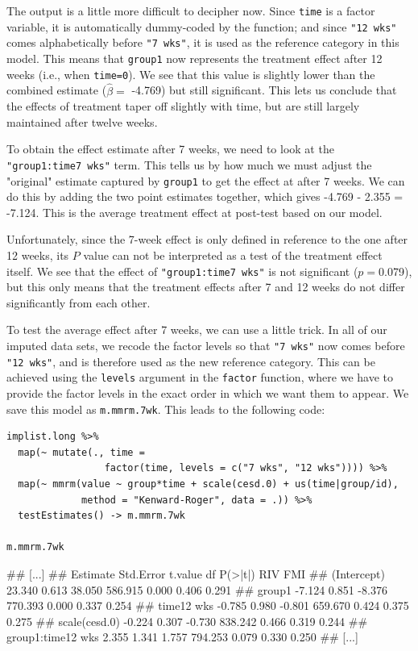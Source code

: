 The output is a little more difficult to decipher now. Since \texttt{time} is a factor variable, it is automatically dummy-coded by the function; and since \texttt{"12 wks"} comes alphabetically before \texttt{"7 wks"}, it is used as the reference category in this model. This means that \texttt{group1} now represents the treatment effect after 12 weeks (i.e., when \texttt{time=0}). We see that this value is slightly lower than the combined estimate ($\hat\beta=$ -4.769) but still significant. This lets us conclude that the effects of treatment taper off slightly with time, but are still largely maintained after twelve weeks. 

To obtain the effect estimate after 7 weeks, we need to look at the \texttt{"group1:time7 wks"} term. This tells us by how much we must adjust the "original" estimate captured by \texttt{group1} to get the effect at after 7 weeks. We can do this by adding the two point estimates together, which gives -4.769 - 2.355 = -7.124. This is the average treatment effect at post-test based on our model. 

Unfortunately, since the 7-week effect is only defined in reference to the one after 12 weeks, its $P$ value can not be interpreted as a test of the treatment effect itself. We see that the effect of \texttt{"group1:time7 wks"} is not significant ($p=$0.079), but this only means that the treatment effects after 7 and 12 weeks do not differ significantly from each other. 

To test the average effect after 7 weeks, we can use a little trick. In all of our imputed data sets, we recode the factor levels so that \texttt{"7 wks"} now comes before \texttt{"12 wks"}, and is therefore used as the new reference category. This can be achieved using the \texttt{levels} argument in the \texttt{factor} function, where we have to provide the factor levels in the exact order in which we want them to appear. We save this model as \texttt{m.mmrm.7wk}. This leads to the following code:

\begin{lstlisting}
implist.long %>% 
  map(~ mutate(., time = 
                 factor(time, levels = c("7 wks", "12 wks")))) %>% 
  map(~ mmrm(value ~ group*time + scale(cesd.0) + us(time|group/id), 
             method = "Kenward-Roger", data = .)) %>% 
  testEstimates() -> m.mmrm.7wk

m.mmrm.7wk
\end{lstlisting}

\begin{example}
## [...]
##                   Estimate Std.Error t.value      df P(>|t|)   RIV   FMI 
## (Intercept)         23.340     0.613  38.050 586.915   0.000 0.406 0.291 
## group1              -7.124     0.851  -8.376 770.393   0.000 0.337 0.254 
## time12 wks          -0.785     0.980  -0.801 659.670   0.424 0.375 0.275 
## scale(cesd.0)       -0.224     0.307  -0.730 838.242   0.466 0.319 0.244 
## group1:time12 wks    2.355     1.341   1.757 794.253   0.079 0.330 0.250 
## [...]
\end{example}

